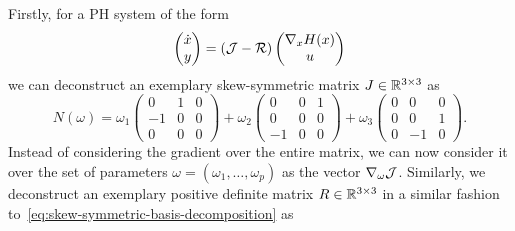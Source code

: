Firstly, for a \ac{PH} system of the form
\begin{equation*}
    \begin{pmatrix}
        \dot{x} \\
        y
    \end{pmatrix} = (\mathcal{J} - \mathcal{R}) \begin{pmatrix}
        \nabla_x H(x) \\
        u
    \end{pmatrix}
\end{equation*}
we can deconstruct an exemplary skew-symmetric matrix $J \in \mathbb{R}^{3 \times 3}$ as
\begin{equation}\label{eq:skew-symmetric-basis-decomposition}
    N(\omega) = \omega_1 \begin{pmatrix}
        0 & 1 & 0 \\
        -1 & 0 & 0 \\
        0 & 0 & 0
    \end{pmatrix} + \omega_2 \begin{pmatrix}
        0 & 0 & 1 \\
        0 & 0 & 0 \\
        -1 & 0 & 0
    \end{pmatrix} + \omega_3 \begin{pmatrix}
        0 & 0 & 0 \\
        0 & 0 & 1 \\
        0 & -1 & 0
    \end{pmatrix}.
\end{equation}
Instead of considering the gradient over the entire matrix, we can now consider it over the set of parameters $\omega = (\omega_1, \dots, \omega_p)$ as the vector $\nabla_\omega \mathcal{J}$.
Similarly, we deconstruct an exemplary positive definite matrix $R \in \mathbb{R}^{3 \times 3}$ in a similar fashion to~\eqref{eq:skew-symmetric-basis-decomposition} as
